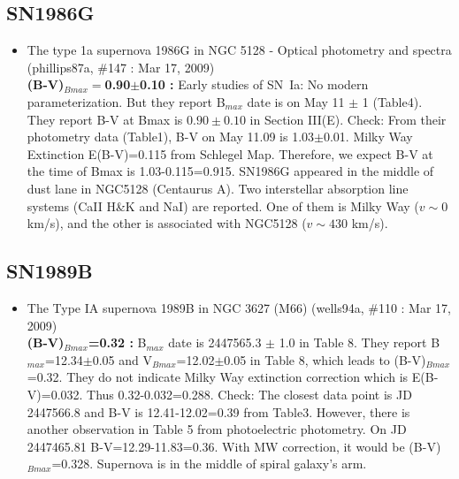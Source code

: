\subsection{\bf SN1986G}
\begin{itemize}
\item The type 1a supernova 1986G in NGC 5128 - Optical photometry and spectra 
(phillips87a, \#147 : Mar 17, 2009) \citet{phillips87a} \\
{\bf (B-V)$_{Bmax}=$0.90$\pm$0.10 : } Early studies of SN~Ia: No modern parameterization.  
But they report B$_{max}$ date is on May 11 $\pm$ 1 (Table4).
They report B-V at Bmax is $0.90\pm0.10$ in Section III(E).
Check: From their photometry data (Table1), B-V on May 11.09 is 1.03$\pm$0.01.
Milky Way Extinction E(B-V)=0.115 from Schlegel Map.
Therefore, we expect B-V at the time of Bmax is 1.03-0.115=0.915.
SN1986G appeared in the
middle of dust lane in NGC5128 (Centaurus A).  Two interstellar absorption
line systems (CaII H\&K and NaI) are reported.  One of them is Milky Way ($v \sim 0 $ km/s), and the
other is associated with NGC5128 ($v \sim 430 $ km/s).
\end{itemize}
\subsection{\bf SN1989B}
\begin{itemize}
\item The Type IA supernova 1989B in NGC 3627 (M66) (wells94a, \#110 : Mar 17, 2009) 
\citet{wells94a}\\
{\bf (B-V)$_{Bmax}$=0.32 :} B$_{max}$ date is 2447565.3 $\pm$ 1.0 in Table 8.  
They report B$_{max}$=12.34$\pm$0.05 and V$_{Bmax}$=12.02$\pm$0.05 in Table 8, which
leads to (B-V)$_{Bmax}$=0.32.   They do not indicate Milky Way extinction correction
which is E(B-V)=0.032.  Thus 0.32-0.032=0.288.
Check: The closest data point is JD 2447566.8 and B-V is 12.41-12.02=0.39 from Table3.
However, there is another observation in Table 5 from photoelectric photometry.
On JD 2447465.81 B-V=12.29-11.83=0.36. With MW correction, it would be (B-V)$_{Bmax}$=0.328.
Supernova is in the middle of spiral galaxy's arm.
\end{itemize}
